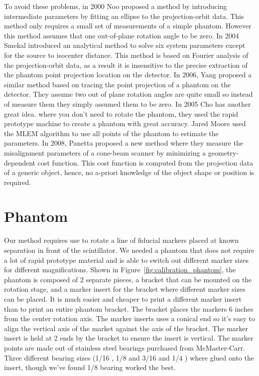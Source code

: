 To avoid these problems, in 2000 Noo \citep{Noo2000} proposed a method by introducing intermediate parameters by fitting an ellipse to the projection-orbit data.  This method only requires a small set of measurements of a simple phantom.  However this method assumes that one out-of-plane rotation angle to be zero.  In 2004 Smekal introduced an analytical method to solve six system parameters except for the source to isocenter distance.  This method is based on Fourier analysis of the projection-orbit data, as a result it is insensitive to the precise extraction of the phantom point projection location on the detector.  In 2006, Yang \citep{Yang2006} proposed a similar method based on tracing the point projection of a phantom on the detector.  They assume two out of plane rotation angles are quite small so instead of measure them they simply assumed them to be zero.  In 2005 Cho has another great idea. \citep{Cho2005} where you don't need to rotate the phantom, they used the rapid prototype machine to create a phantom with great accuracy.  Jared Moore used the MLEM algorithm to use all points of the phantom to estimate the parameters.  In 2008, Panetta \citep{Panetta2008} proposed a new method where they measure the misalignment parameters of a cone-beam scanner by minimizing a geometry-dependent cost function.  This cost function is computed from the projection data of a generic object, hence, no a-priori knowledge of the object shape or position is required.  

\section{Phantom}
Our method requires use to rotate a line of fiducial markers placed at known separation in front of the scintillator.  We needed a phantom that does not require a lot of rapid prototype material and is able to switch out different marker sizes for different magnifications.  Shown in Figure~\ref{fig:calibration_phantom}, the phantom is composed of 2 separate pieces, a bracket that can be mounted on the rotation stage, and a marker insert for the bracket where different marker sizes can be placed.  It is much easier and cheaper to print a different marker insert than to print an entire phantom bracket.  The bracket places the markers 6 inches from the center rotation axis.  The marker inserts uses a conical end so it's easy to align the vertical axis of the market against the axis of the bracket.  The marker insert is held at 2 ends by the bracket to ensure the insert is vertical.  The marker points are made out of stainless steel bearings purchased from McMaster-Carr.  Three different bearing sizes (1/16 \inches, 1/8 \inches and 3/16 \inches and 1/4 \inches) where glued onto the insert, though we've found 1/8 \inches bearing worked the best.  


